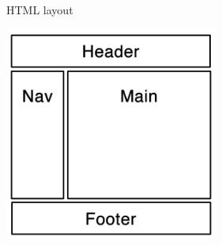 \begin{frame}{HTML layout}
  \begin{center}
    \includegraphics[height=7cm,keepaspectratio]{sources/images/2_Column_Layout.png}
  \end{center}
\end{frame}
